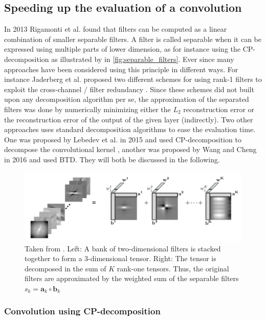 \subsection{Speeding up the evaluation of a convolution}
In 2013 Rigamonti et al. \cite{Rigamonti2013} found that filters can be computed as a linear combination of smaller separable filters. A filter is called separable when it can be expressed using multiple parts of lower dimension, as for instance using the CP-decomposition as illustrated by \cite{Sironi2015} in \autoref{fig:separable_filters}. Ever since many approaches have been considered using this principle in different ways. For instance Jaderberg et al. proposed two different schemes for using rank-1 filters to exploit the cross-channel / filter redundancy \cite{Jaderberg2014}. Since these schemes did not built upon any decomposition algorithm per se, the approximation of the separated filters was done by numerically minimizing either the $L_2$ reconstruction error or the reconstruction error of the output of the given layer (indirectly). Two other approaches uses standard decomposition algorithms to ease the evaluation time. One was proposed by Lebedev et al. in 2015 and used CP-decomposition to decompose the convolutional kernel \cite{Lebedev2015}, another was proposed by Wang and Cheng in 2016 and used BTD. They will both be discussed in the following.

\begin{figure}
    \centering
    \includegraphics[width=.8\linewidth]{Pics/03_Previous_work/separable_filters.png}
    \caption{Taken from \cite{Sironi2015}. Left: A bank of two-dimensional filters is stacked together to form a 3-dimensional tensor. Right: The tensor is decomposed in the sum of $K$ rank-one tensors. Thus, the original filters are approximated by the weighted sum of the separable filters $s_k = \boldsymbol{a}_k \circ \boldsymbol{b}_k$}
    \label{fig:separable_filters}
\end{figure}

\subsubsection{Convolution using CP-decomposition} \label{tex:convUsingCP}

